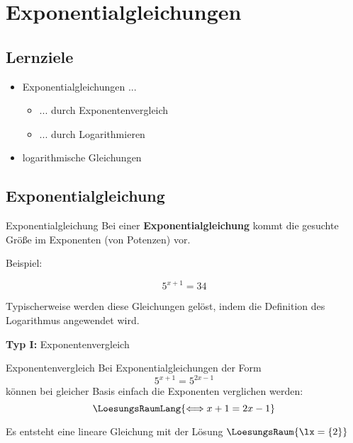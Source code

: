 

\section{Exponentialgleichungen}

\subsection*{Lernziele}

\begin{itemize}
\item Exponentialgleichungen ...
  \begin{itemize}
  \item ... durch Exponentenvergleich
  \item ... durch Logarithmieren
    \end{itemize}
\item logarithmische Gleichungen 
\end{itemize}



\newpage


\subsection{Exponentialgleichung}
\begin{definition}{Exponentialgleichung}{}
  Bei einer \textbf{Exponentialgleichung} kommt die gesuchte Größe im
  Exponenten (von Potenzen) vor.
\end{definition}

Beispiel:

$$5^{x+1} = 34$$

Typischerweise werden diese Gleichungen gelöst, indem die Definition
des Logarithmus angewendet wird.

\textbf{Typ I:} Exponentenvergleich\\

\begin{rezept}{Exponentenvergleich}{}
Bei Exponentialgleichungen der Form $$5^{x+1} = 5^{2x-1}$$ können bei
gleicher Basis einfach die Exponenten verglichen werden:
$$\LoesungsRaumLang{\Longleftrightarrow x+1=2x-1}$$

Es entsteht eine lineare Gleichung mit der Lösung $\LoesungsRaum{\lx = \{2\}}$
\end{rezept}

